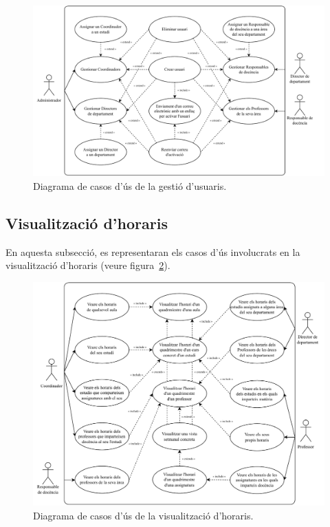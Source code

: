 \documentclass[a4paper,12pt]{ThesisStyle}
\begin{document}
\begin{figure}[H]
  \centering
  \includegraphics[width=\textwidth]{assets/use_cases/usuaris.pdf}
  \caption{\label{img:casos_us_usuaris}Diagrama de casos d'ús de la gestió d'usuaris.}
\end{figure}

\subsection{Visualització d'horaris}
\label{subsec:casos_us_veure_horaris}

En aquesta subsecció, es representaran els casos d'ús involucrats en la visualització d'horaris (veure figura~\ref{img:casos_us_veure_horaris}).

\begin{figure}[H]
  \centering
  \includegraphics[width=\textwidth]{assets/use_cases/horaris/visualitzar.pdf}
  \caption{\label{img:casos_us_veure_horaris}Diagrama de casos d'ús de la visualització d'horaris.}
\end{figure}
\end{document}
